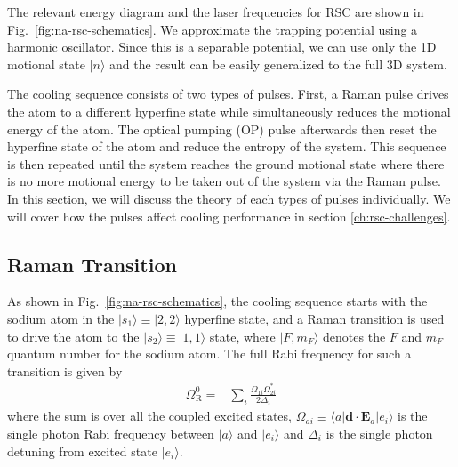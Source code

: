 The relevant energy diagram and the laser frequencies for RSC are shown in
Fig.~\ref{fig:na-rsc-schematics}.
We approximate the trapping potential using a harmonic oscillator.
Since this is a separable potential, we can use only the 1D motional state $|n\rangle$
and the result can be easily generalized to the full 3D system.

The cooling sequence consists of two types of pulses.
First, a Raman pulse drives the atom to a different hyperfine state while simultaneously
reduces the motional energy of the atom.
The optical pumping (OP) pulse afterwards then reset the hyperfine state of the atom
and reduce the entropy of the system.
This sequence is then repeated until the system reaches the ground motional state
where there is no more motional energy to be taken out of the system via the Raman pulse.
In this section, we will discuss the theory of each types of pulses individually.
We will cover how the pulses affect cooling performance in section \ref{ch:rsc-challenges}.

\subsection{Raman Transition}
\label{ch:rsc-basic-theory-raman}

As shown in Fig.~\ref{fig:na-rsc-schematics},
the cooling sequence starts with the sodium atom in the
$|s_1\rangle\equiv|2,2\rangle$ hyperfine state,
and a Raman transition is used to drive the atom to the $|s_2\rangle\equiv|1,1\rangle$ state,
where $|F,m_F\rangle$ denotes the $F$ and $m_F$ quantum number for the sodium atom.
The full Rabi frequency for such a transition is given by
\begin{align}
  \Omega_{\mathrm{R}}^0=&\sum_{i}\frac{\Omega_{1i}\Omega_{2i}^*}{2\Delta_i}\label{rsc-basic-theory-raman-rabi}
\end{align}
where the sum is over all the coupled excited states,
$\Omega_{ai}\equiv\langle a|\mathbf{d}\cdot\mathbf{E}_a|e_i\rangle$ is the single photon
Rabi frequency between $|a\rangle$ and $|e_i\rangle$
and $\Delta_i$ is the single photon detuning from excited state $|e_i\rangle$.

